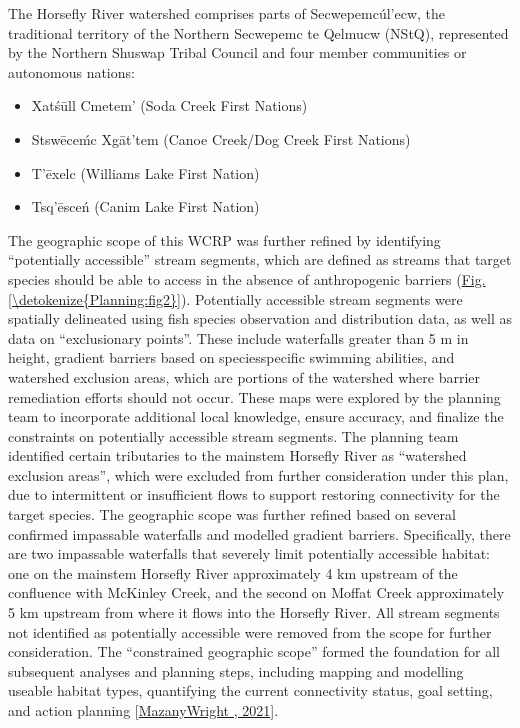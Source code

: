 \documentclass[letterpaper,10pt,english]{jupyterBook}
\begin{document}
\sphinxAtStartPar
The Horsefly River watershed comprises parts of Secwepemcúl’ecw, the traditional territory of the Northern Secwepemc te Qelmucw (NStQ), represented by the Northern Shuswap Tribal Council and four member communities or autonomous nations:
\begin{itemize}
\item {} 
\sphinxAtStartPar
Xatśūll Cmetem’ (Soda Creek First Nations)

\item {} 
\sphinxAtStartPar
Stswēceḿc Xgāt’tem (Canoe Creek/Dog Creek First Nations)

\item {} 
\sphinxAtStartPar
T’ēxelc (Williams Lake First Nation)

\item {} 
\sphinxAtStartPar
Tsq’ēsceń (Canim Lake First Nation)

\end{itemize}

\sphinxAtStartPar
The geographic scope of this WCRP was further refined by identifying “potentially accessible” stream segments, which are defined as streams that target species should be able to access in the absence of anthropogenic barriers (\hyperref[\detokenize{Planning:fig2}]{Fig.\@ \ref{\detokenize{Planning:fig2}}}). Potentially accessible stream segments were spatially delineated using fish species observation and distribution data, as well as data on “exclusionary points”. These include waterfalls greater than 5 m in height, gradient barriers based on species\sphinxhyphen{}specific swimming abilities, and watershed exclusion areas, which are portions of the watershed where barrier remediation efforts should not occur. These maps were explored by the planning team to incorporate additional local knowledge, ensure accuracy, and finalize the constraints on potentially accessible stream segments. The planning team identified certain tributaries to the mainstem Horsefly River as “watershed exclusion areas”, which were excluded from further consideration under this plan, due to intermittent or insufficient flows to support restoring connectivity for the target species. The geographic scope was further refined based on several confirmed impassable waterfalls and modelled gradient barriers. Specifically, there are two impassable waterfalls that severely limit potentially accessible habitat: one on the mainstem Horsefly River approximately 4 km upstream of the confluence with McKinley Creek, and the second on Moffat Creek approximately 5 km upstream from where it flows into the Horsefly River. All stream segments not identified as potentially accessible were removed from the scope for further consideration. The “constrained geographic scope” formed the foundation for all subsequent analyses and planning steps, including mapping and modelling useable habitat types, quantifying the current connectivity status, goal setting, and action planning {[}\hyperlink{cite.references:id12}{Mazany\sphinxhyphen{}Wright , 2021}{]}.
\end{document}
